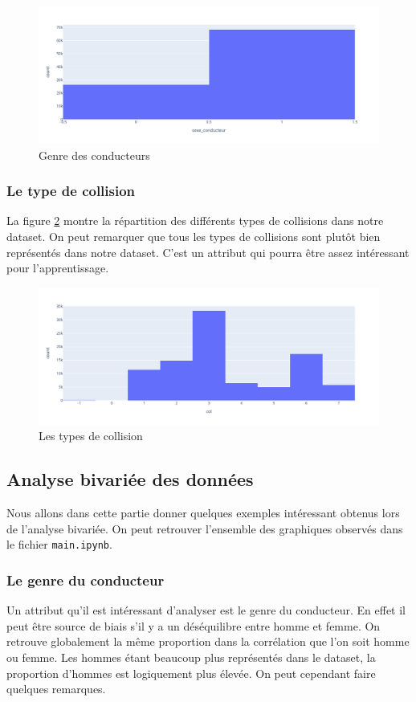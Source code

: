 \documentclass{article}
\begin{document}
    \begin{figure}[ht]
        \centering
        \includegraphics[width=12cm]{./img/sexe.png}
        \caption{Genre des conducteurs}
        \label{fig:fig_genre}
    \end{figure}

    \subsubsection{Le type de collision}
    La figure \ref{fig:fig_col} montre la répartition des différents types de collisions dans notre dataset. On peut 
    remarquer que tous les types de collisions sont plutôt bien représentés dans notre dataset. C'est un attribut qui 
    pourra être assez intéressant pour l'apprentissage.

    \begin{figure}[ht]
        \centering
        \includegraphics[width=12cm]{./img/col.png}
        \caption{Les types de collision}
        \label{fig:fig_col}
    \end{figure}

    \subsection{Analyse bivariée des données}
    Nous allons dans cette partie donner quelques exemples intéressant obtenus lors de l'analyse bivariée. On 
    peut retrouver l'ensemble des graphiques observés dans le fichier \texttt{main.ipynb}.

    \subsubsection{Le genre du conducteur}
    Un attribut qu'il est intéressant d'analyser est le genre du conducteur. En effet il peut être source de biais 
    s'il y a un déséquilibre entre homme et femme.
    On retrouve globalement la même proportion dans la corrélation que l'on soit homme ou femme. Les hommes étant 
    beaucoup plus représentés dans le dataset, la proportion d'hommes est logiquement plus élevée. On peut cependant 
    faire quelques remarques. 
    
\end{document}
